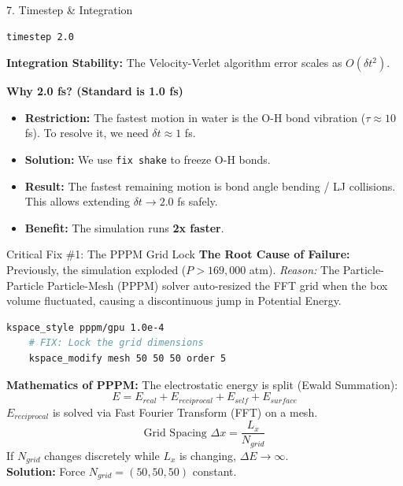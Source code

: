 \documentclass[aspectratio=169, 10pt]{beamer}
\begin{document}
\begin{frame}[fragile]{7. Timestep \& Integration}
    \begin{lstlisting}[language=bash]
    timestep 2.0
    \end{lstlisting}

    \textbf{Integration Stability:}
    The Velocity-Verlet algorithm error scales as $O(\delta t^2)$.
    
    \textbf{Why 2.0 fs? (Standard is 1.0 fs)}
    \begin{itemize}
        \item \textbf{Restriction:} The fastest motion in water is the O-H bond vibration ($\tau \approx 10$ fs). To resolve it, we need $\delta t \approx 1$ fs.
        \item \textbf{Solution:} We use \texttt{fix shake} to freeze O-H bonds.
        \item \textbf{Result:} The fastest remaining motion is bond angle bending / LJ collisions. This allows extending $\delta t \to 2.0$ fs safely.
        \item \textbf{Benefit:} The simulation runs \textbf{2x faster}.
    \end{itemize}
\end{frame}
\begin{frame}[fragile]{Critical Fix \#1: The PPPM Grid Lock}
    \textbf{The Root Cause of Failure:}
    Previously, the simulation exploded ($P > 169,000$ atm).
    \textit{Reason:} The Particle-Particle Particle-Mesh (PPPM) solver auto-resized the FFT grid when the box volume fluctuated, causing a discontinuous jump in Potential Energy.

    \begin{lstlisting}[language=bash]
    kspace_style pppm/gpu 1.0e-4
    # FIX: Lock the grid dimensions
    kspace_modify mesh 50 50 50 order 5
    \end{lstlisting}

    \textbf{Mathematics of PPPM:}
    The electrostatic energy is split (Ewald Summation):
    \begin{equation}
        E = E_{real} + E_{reciprocal} + E_{self} + E_{surface}
    \end{equation}
    $E_{reciprocal}$ is solved via Fast Fourier Transform (FFT) on a mesh.
    \[ \text{Grid Spacing } \Delta x = \frac{L_x}{N_{grid}} \]
    If $N_{grid}$ changes discretely while $L_x$ is changing, $\Delta E \to \infty$. \\
    \textbf{Solution:} Force $N_{grid} = (50, 50, 50)$ constant.
\end{frame}
\end{document}
